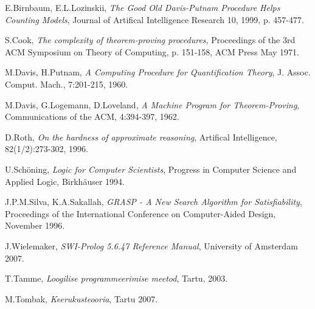 \begin{thebibliography}{20}

E.Birnbaum, E.L.Lozinskii, \emph{The Good Old
Davis-Putnam Procedure Helps Counting Models},
Journal of Artifical Intelligence Research 10, 1999, p. 457-477.

S.Cook, \emph{The complexity of theorem-proving
procedures}, Proceedings of the 3rd ACM Symposium on Theory of Computing,
p. 151-158, ACM Press May 1971.

M.Davis, H.Putnam, \emph{A Computing Procedure for
Quantification Theory},
J. Assoc. Comput. Mach., 7:201-215, 1960.

M.Davis, G.Logemann, D.Loveland, \emph{A Machine
Program for Theorem-Proving},
Communications of the ACM, 4:394-397, 1962.

D.Roth, \emph{On the hardness of approximate reasoning},
Artifical Intelligence, 82(1/2):273-302, 1996.

U.Schöning, \emph{Logic for Computer Scientists},
Progress in Computer Science and Applied Logic, Birkhäuser 1994.

J.P.M.Silva, K.A.Sakallah, \emph{GRASP - A New Search
Algorithm for Satisfiability}, Proceedings of the International Conference on
Computer-Aided Design, November 1996.

J.Wielemaker, \emph{SWI-Prolog 5.6.47 Reference
Manual}, University of Amsterdam 2007.

T.Tamme, \emph{Loogilise programmeerimise meetod},
Tartu, 2003.

M.Tombak, \emph{Keerukusteooria}, Tartu 2007.

\end{thebibliography}